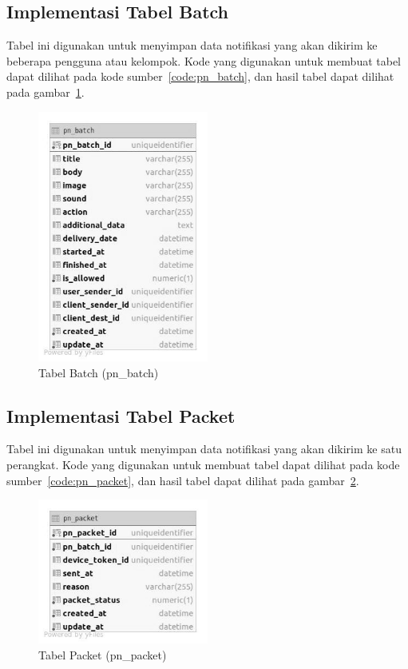 \subsection{Implementasi Tabel Batch}
\par Tabel ini digunakan untuk menyimpan data notifikasi yang akan dikirim ke beberapa pengguna atau kelompok. Kode yang digunakan untuk membuat tabel dapat dilihat pada kode sumber~\ref{code:pn_batch}, dan hasil tabel dapat dilihat pada gambar~\ref{tabel_pn_batch}.

\begin{figure}[H]
    \centering\includegraphics[width=0.5\textwidth]{bab4/figures/tabel_pn_batch.jpg}
    \caption{Tabel Batch (pn\_batch)}
    \label{tabel_pn_batch}
\end{figure}

\subsection{Implementasi Tabel Packet}
\par Tabel ini digunakan untuk menyimpan data notifikasi yang akan dikirim ke satu perangkat. Kode yang digunakan untuk membuat tabel dapat dilihat pada kode sumber~\ref{code:pn_packet}, dan hasil tabel dapat dilihat pada gambar~\ref{tabel_pn_packet}.

\begin{figure}[H]
    \centering\includegraphics[width=0.5\textwidth]{bab4/figures/tabel_pn_packet.jpg}
    \caption{Tabel Packet (pn\_packet)}
    \label{tabel_pn_packet}
\end{figure}

